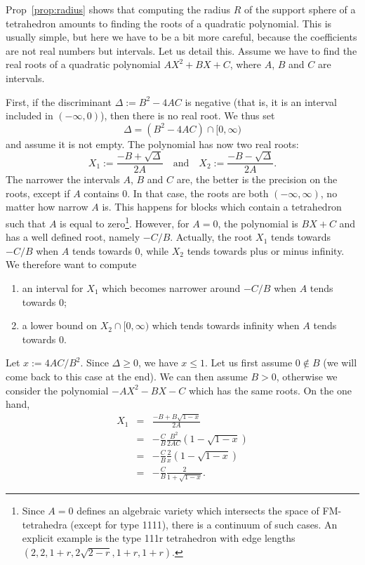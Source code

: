 \documentclass[11pt]{article}
\begin{document}
Prop~\ref{prop:radius} shows that computing the radius $R$ of the support sphere of a tetrahedron amounts to finding the roots of a quadratic polynomial.
This is usually simple, but here we have to be a bit more careful, because the coefficients are not real numbers but intervals.
Let us detail this.
Assume we have to find the real roots of a quadratic polynomial $AX^2+BX+C$, where $A$, $B$ and $C$ are intervals.

First, if the discriminant $\Delta:=B^2-4AC$ is negative (that is, it is an interval included in $(-\infty,0)$), then there is no real root.
We thus set
\[
\Delta=(B^2-4AC)\cap [0,\infty)
\]
and assume it is not empty.
The polynomial has now two real roots:
\[
X_1:=\frac{-B+\sqrt{\Delta}}{2A}
\quad\textrm{and}\quad
X_2:=\frac{-B-\sqrt{\Delta}}{2A}.
\]
The narrower the intervals $A$, $B$ and $C$ are, the better is the precision on the roots, except if $A$ contains $0$.
In that case, the roots are both $(-\infty,\infty)$, no matter how narrow $A$ is.
This happens for blocks which contain a tetrahedron such that $A$ is equal to zero\footnote{Since $A=0$ defines an algebraic variety which intersects the space of FM-tetrahedra (except for type 1111), there is a continuum of such cases.
An explicit example is the type 111r tetrahedron with edge lengths $(2,2,1+r,2\sqrt{2-r},1+r,1+r)$.}.
However, for $A=0$, the polynomial is $BX+C$ and has a well defined root, namely $-C/B$.
Actually, the root $X_1$ tends towards $-C/B$ when $A$ tends towards $0$, while $X_2$ tends towards plus or minus infinity.
We therefore want to compute
\begin{enumerate}
\item an interval for $X_1$ which becomes narrower around $-C/B$ when $A$ tends towards $0$;
\item a lower bound on $X_2\cap[0,\infty)$ which tends towards infinity when $A$ tends towards $0$.
\end{enumerate}
Let $x:=4AC/B^2$.
Since $\Delta\geq 0$, we have $x\leq 1$.
Let us first assume $0\notin B$ (we will come back to this case at the end).
We can then assume $B>0$, otherwise we consider the polynomial $-AX^2-BX-C$ which has the same roots.
On the one hand,
\begin{eqnarray*}
X_1&=&\frac{-B+B\sqrt{1-x}}{2A}\\
&=&-\frac{C}{B}\frac{B^2}{2AC}(1-\sqrt{1-x})\\
&=&-\frac{C}{B}\frac{2}{x}(1-\sqrt{1-x})\\
&=&-\frac{C}{B}\frac{2}{1+\sqrt{1-x}}.
\end{eqnarray*}
\end{document}
